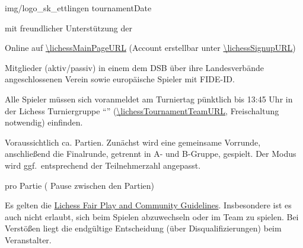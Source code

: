 \documentclass[paper=a4, fontsize=10pt]{scrartcl}
\begin{document}
                 {img/logo_sk_ettlingen}
                 {\tournamentName}
                 {tournamentDate}


\begin{description}[leftmargin=\dimexpr\wd\descbox+\labelsep,align=Left]

\item[Veranstalter:]
  \organizerName{} mit freundlicher Unterstützung der \sponsorName{}

\item[Spielort:]

  Online auf \url{\lichessMainPageURL} (Account erstellbar unter
  \url{\lichessSignupURL})

\item[Spielberechtigt:]

  Mitglieder (aktiv/passiv) in einem dem DSB über ihre Landesverbände
  angeschlossenen Verein sowie europäische Spieler mit FIDE-ID.

\item[Zeitplan am \DTMUsedate{tournamentDate}:]

  Alle Spieler müssen sich voranmeldet am Turniertag pünktlich bis
  13:45 Uhr in der Lichess Turniergruppe
  ``\tournamentName'' (\url{\lichessTournamentTeamURL},
  Freischaltung notwendig) einfinden.

\item[Modus:]

  Voraussichtlich ca. \expectedTotalGames{} Partien. Zunächst wird
  eine gemeinsame Vorrunde, anschließend die Finalrunde, getrennt in
  A- und B-Gruppe, gespielt. Der Modus wird ggf.\ entsprechend der
  Teilnehmerzahl angepasst.

\item[Bedenkzeit:]

  \timePerGame{} pro Partie (\pauseBetweenGames{} Pause zwischen den
  Partien)

\item[Fair Play:]

  Es gelten die \href{\lichessTermsOfServiceURL}{Lichess Fair Play and
    Community Guidelines}. Insbesondere ist es auch nicht erlaubt,
  sich beim Spielen abzuwechseln oder im Team zu spielen. Bei
  Verstößen liegt die endgültige Entscheidung (über
  Disqualifizierungen) beim Veranstalter.

\item[Schiedsrichter:]

  \arbiter{}

\item[Preise:]


\end{description}
\end{document}
